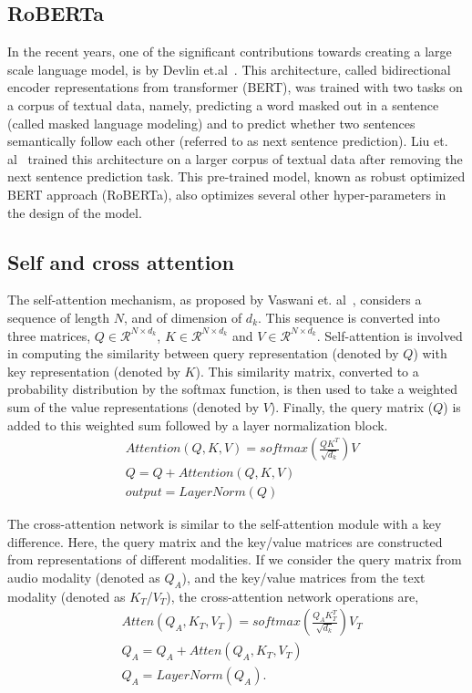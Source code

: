 \documentclass[lettersize,journal]{IEEEtran}
\begin{document}
\subsection{RoBERTa}
In the recent years, one of the significant contributions towards creating a large scale language model, is by Devlin et.al~\cite{devlin2019bert}. This architecture, called bidirectional encoder representations from transformer (BERT), was trained with two tasks on a corpus of textual data, namely, predicting a word masked out in a sentence (called masked language modeling) and to predict whether two sentences semantically follow each other (referred to as next sentence prediction). Liu et. al~\cite{liu2019roberta} trained this architecture on a larger corpus of textual data after removing the next sentence prediction task. This pre-trained model, known as robust optimized BERT approach (RoBERTa), also optimizes several other hyper-parameters in the design of the model. 

\subsection{Self and cross attention}\label{sec:self_cross_attn} 
The self-attention mechanism, as proposed by Vaswani et. al~\cite{vaswani2017attention}, considers a sequence of length $N$, and of dimension of $d_k$. This sequence is converted into three matrices, $Q \in \mathcal{R}^{N \times d_k}$, $K \in \mathcal{R}^{N \times d_k}$ and $V\in \mathcal{R}^{N \times d_k}$. Self-attention is involved in computing the similarity between query representation (denoted by $Q$) with key representation (denoted by $K$). This similarity matrix, converted to a probability distribution by the softmax function, is then used to take a weighted sum of the value representations (denoted by $V$). Finally, the query matrix ($Q$) is added to this weighted sum followed by a layer normalization block.
    \begin{eqnarray}
    &Attention(Q, K, V) = softmax(\frac{QK^{T}}{\sqrt{d_k}})V\\\label{selfattn1}
    &Q = Q + Attention(Q, K, V)\\\label{selfattn2}
    &output = LayerNorm(Q)\label{selfattn3}
\end{eqnarray}
\par
The cross-attention network is similar to the self-attention module with a key difference. Here, the query matrix and the key/value matrices are constructed from representations of different modalities. If we consider the query matrix from audio modality (denoted as $Q_A$), and the key/value matrices from the text modality (denoted as $K_T$/$V_T$), the cross-attention network operations are, 
\begin{eqnarray}
&Atten(Q_A, K_{T}, V_{T}) = softmax(\frac{Q_{A}K_{T}^{T}}{\sqrt{d_k}})V_{T}\label{crossatt1}\\
&Q_A = Q_A + Atten(Q_A, K_{T}, V_{T})\label{crossatt2}\\
&Q_A = LayerNorm(Q_A).\label{crossatt3}
\end{eqnarray}
\end{document}
